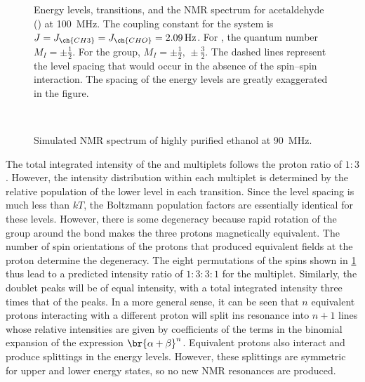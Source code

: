 \begin{figure}[htb]
  \centering
  
  \caption{Energy levels, transitions, and the NMR spectrum for acetaldehyde () at \SI{100}{\MHz}. 
  The coupling constant for the system is \( {J = J_{\ch{CH3}} = J_{\ch{CHO}} = \SI{2.09}{\Hz}} \). 
  For , the quantum number \( {M_I = \pm\tfrac{1}{2}} \). For the  group, \( {M_I = \pm\tfrac{1}{2}, \, \pm\tfrac{3}{2}} \). 
  The dashed lines represent the level spacing that would occur in the absence of the spin--spin interaction.
  The spacing of the energy levels are greatly exaggerated in the figure.}
  \label{fig:spin_splitting}
\end{figure}  

\begin{figure}[htb]
  \centering
  
	\caption{Simulated NMR spectrum of highly purified ethanol at \SI{90}{\MHz}.}\
	\label{fig:EtOH_spectrum}
\end{figure}
The total integrated intensity of the  and  multiplets follows the proton ratio of \( 1{:}3 \). 
However, the intensity distribution within each multiplet is determined by the relative population of the lower level in each transition. 
Since the level spacing is much less than \( kT \), the Boltzmann population factors are essentially identical for these levels. 
However, there is some degeneracy because rapid rotation of the  group around the \ch{C-C} bond makes the three protons magnetically equivalent. 
The number of spin orientations of the  protons that produced equivalent fields at the  proton determine the degeneracy. 
The eight permutations of the  spins shown in \cref{fig:spin_splitting} thus lead to a predicted intensity ratio of \( 1{:}3{:}3{:}1 \) for the  multiplet. 
Similarly, the \ch{CH3} doublet peaks will be of equal intensity, with a total integrated intensity three times that of the \ch{CH} peaks. 
In a more general sense, it can be seen that \( n \) equivalent protons interacting with a different proton will split ins resonance into \( n + 1 \) lines whose relative intensities are given by coefficients of the terms in the binomial expansion of the expression \( \br{\alpha + \beta}^n \). 
Equivalent protons also interact and produce splittings in the energy levels. 
However, these splittings are symmetric for upper and lower energy states, so no new NMR resonances are produced. 
